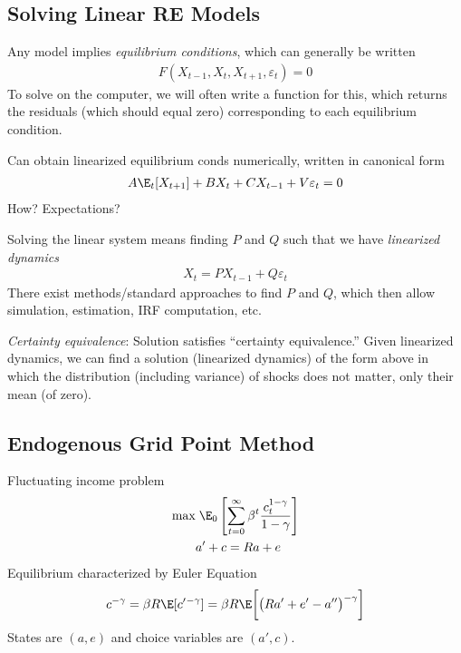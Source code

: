 \documentclass[12pt]{article}
\theoremstyle{plain}
\theoremstyle{definition}
\theoremstyle{remark}
\newcommand{\sumtinfz}{\sum^\infty_{t=0}}
\begin{document}
\subsection{Solving Linear RE Models}

Any model implies \emph{equilibrium conditions}, which can generally be
written
\begin{align*}
  F(X_{t-1}, X_t, X_{t+1}, \varepsilon_t) = 0
\end{align*}
To solve on the computer, we will often write a function for this, which
returns the residuals (which should equal zero) corresponding to each
equilibrium condition.

Can obtain linearized equilibrium conds numerically, written in
canonical form
\begin{align*}
  A \E_t[X_{t+1}] + BX_t + C X_{t-1} + V \varepsilon_t = 0
\end{align*}
How? Expectations?

Solving the linear system means finding $P$ and $Q$ such that we have
\emph{linearized dynamics}
\begin{align*}
  X_t = PX_{t-1} + Q\varepsilon_t
\end{align*}
There exist methods/standard approaches to find $P$ and $Q$, which then
allow simulation, estimation, IRF computation, etc.

\emph{Certainty equivalence}:
Solution satisfies ``certainty equivalence.''
Given linearized dynamics, we can find a solution (linearized dynamics)
of the form above in which the distribution (including variance) of
shocks does not matter, only their mean (of zero).


\clearpage
\subsection{Endogenous Grid Point Method}

Fluctuating income problem
\begin{align*}
  \max
  &
  \;
  \E_0\left[
    \sumtinfz
    \beta^t
    \frac{c_t^{1-\gamma}}{1-\gamma}
  \right]
  \\
  &a'+c = Ra + e
\end{align*}
Equilibrium characterized by Euler Equation
\begin{align*}
  c^{-\gamma}
  =
  \beta R
  \E[c'{}^{-\gamma}]
  =
  \beta R
  \E\bigg[
    \big(
    Ra' + e' - a''
    \big)^{-\gamma}
  \bigg]
\end{align*}
States are $(a,e)$ and choice variables are $(a',c)$.
\end{document}
